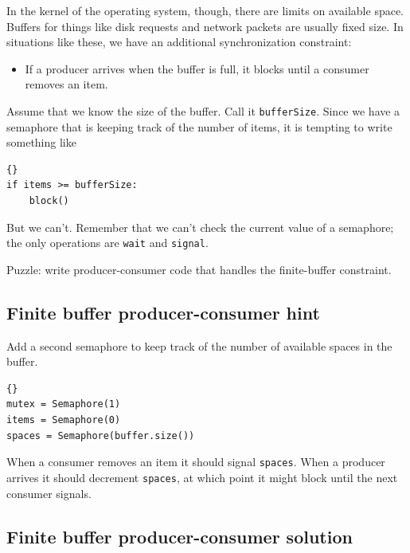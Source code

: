 \documentclass{book}
\newcommand{\clearemptydoublepage}{\newpage\cleardoublepage}
\begin{document}
In the kernel of the operating system, though, there are
limits on available space.  Buffers for things like disk
requests and network packets are usually fixed size.  In
situations like these, we have an additional synchronization
constraint:

\begin{itemize}

\item If a producer arrives when the buffer is full, it
blocks until a consumer removes an item.

\end{itemize}

Assume that we know the size of the buffer.  Call it
{\tt bufferSize}.  Since we have a semaphore that is keeping
track of the number of items, it is tempting to write something
like 

\begin{lstlisting}[caption={Broken finite buffer solution}]{}
if items >= bufferSize:
    block()
\end{lstlisting}

But we can't.  Remember that we can't check the current
value of a semaphore; the only operations are {\tt wait}
and {\tt signal}.

Puzzle: write producer-consumer code that handles the finite-buffer
constraint.

\clearemptydoublepage
\subsection{Finite buffer producer-consumer hint}

Add a second semaphore to keep track of the number of
available spaces in the buffer.

\begin{lstlisting}[caption={Finite-buffer producer-consumer initialization}]{}
mutex = Semaphore(1)
items = Semaphore(0)
spaces = Semaphore(buffer.size())
\end{lstlisting}

When a consumer removes an item it should signal {\tt spaces}.
When a producer arrives it should decrement {\tt spaces}, at
which point it might block until the next consumer signals.


\clearemptydoublepage
\subsection{Finite buffer producer-consumer solution}
\end{document}
